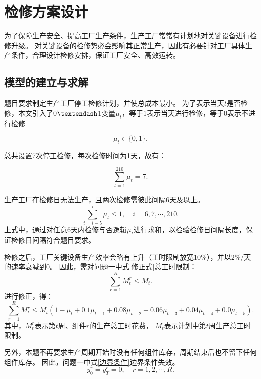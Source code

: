 \section{检修方案设计} %
\label{sec:检修方案设计}

为了保障生产安全、提高工厂生产条件，生产工厂常常有计划地对关键设备进行检修升级。
对关键设备的检修势必会影响其正常生产，因此有必要针对工厂具体生产条件，合理设计检修安排，保证工厂安全、高效运转。

\subsection{模型的建立与求解} %
\label{sub:模型的建立与求解}

题目要求制定生产工厂停工检修计划，并使总成本最小。
为了表示当天$t$是否检修，本文引入了0$\textendash$1变量$\mu_t$，等于1表示当天进行检修，等于0表示不进行检修

\begin{equation}
	\mu_{t} \in\{0,1\}.
\end{equation}

总共设置7次停工检修，每次检修时间为1天，故有：

\begin{equation}
	\sum_{t=1}^{210}\mu_t=7.
\end{equation}

生产工厂在检修日无法生产，且两次检修需彼此间隔6天及以上。
\begin{equation}
	\sum_{t=i-5}^{i} \mu_{t} \leqslant 1,\quad i=6,7, \cdots, 210.
\end{equation}
上式中，通过对任意6天内检修与否逻辑$\mu_t$进行求和，以检验检修日间隔长度，保证检修日间隔符合题目要求。

检修之后，工厂关键设备生产效率会略有上升（工时限制放宽10\%），并以2\%/天的速率衰减到0。
因此，需对问题一中式\ref{修正式}总工时限制：
\begin{equation}
	\sum_{r=1}^{R} M_{t}^{r} \leqslant M_{t}.
\end{equation}
进行修正，得：
\begin{equation}
	\sum_{r=1}^{R} M_{t}^{r} \leqslant M_{t}\left(1-\mu_{t}+0.1 \mu_{t-1}+0.08 \mu_{t-2}+0.06 \mu_{t-3}+0.04 \mu_{t-4}+0.0 \mu_{t-5}\right).
\end{equation}
其中，$M_{t}^{r}$表示第$t$周、组件$r$的生产总工时花费，
$M_{t}$表示计划中第$t$周生产总工时限制。


另外，本题不再要求生产周期开始时没有任何组件库存，周期结束后也不留下任何组件库存。
因此，问题一中式\ref{边界条件}边界条件失效。
\begin{equation}
	y_{0}^{r}=y_{T}^{r}=0,\quad r=1,2, \cdots, R.
\end{equation}

